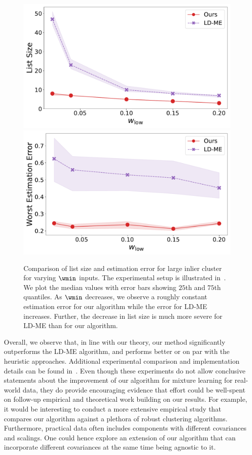 \begin{figure}[t]
    \centering
    \begin{minipage}[t]{\linewidth}
        \includegraphics[width=0.49\linewidth]
        {chapters/robust/figures/wlow_variation_size.pdf}
        \includegraphics[width=0.49\linewidth]{chapters/robust/figures/wlow_variation_error_large.pdf}
    \end{minipage}
    \caption{Comparison of list size and estimation error for large inlier cluster for varying \(\wmin\) inputs. The experimental setup is illustrated in~. We plot the median values with error bars showing \(25\)th and \(75\)th quantiles. As \(\wmin\) decreases, we observe a roughly constant estimation error for our algorithm while the error for LD-ME increases. Further, the decrease in list size is much more severe for LD-ME than for our algorithm.}
    \label{fig:wlow_variation_short}
\end{figure}

Overall, we observe that, in line with our theory, our method significantly outperforms the LD-ME algorithm, and performs better or on par with the heuristic approaches. Additional experimental comparison and implementation details can be found in~. Even though these experiments do not allow conclusive statements about the improvement of our algorithm for mixture learning for real-world data, they do provide encouraging evidence that effort could be well-spent on follow-up empirical and theoretical work building on our results. 
For example, it would be interesting to conduct a more extensive empirical study that compares our algorithm against a plethora of robust clustering algorithms. 
Furthermore, practical data often includes components with different covariances and scalings. One could hence explore an extension of our algorithm that can incorporate different covariances at the same time being agnostic to it. 
